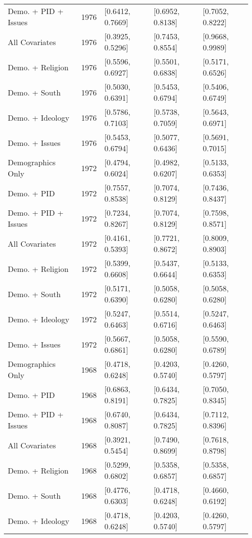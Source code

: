 \begin{longtable}{lrlll}
  Demo. + PID + Issues & 1976 & [0.6412, 0.7669] & [0.6952, 0.8138] & [0.7052, 0.8222] \\ 
  All Covariates & 1976 & [0.3925, 0.5296] & [0.7453, 0.8554] & [0.9668, 0.9989] \\ 
  Demo. + Religion & 1976 & [0.5596, 0.6927] & [0.5501, 0.6838] & [0.5171, 0.6526] \\ 
  Demo. + South & 1976 & [0.5030, 0.6391] & [0.5453, 0.6794] & [0.5406, 0.6749] \\ 
  Demo. + Ideology & 1976 & [0.5786, 0.7103] & [0.5738, 0.7059] & [0.5643, 0.6971] \\ 
  Demo. + Issues & 1976 & [0.5453, 0.6794] & [0.5077, 0.6436] & [0.5691, 0.7015] \\ 
  Demographics Only & 1972 & [0.4794, 0.6024] & [0.4982, 0.6207] & [0.5133, 0.6353] \\ 
  Demo. + PID & 1972 & [0.7557, 0.8538] & [0.7074, 0.8129] & [0.7436, 0.8437] \\ 
  Demo. + PID + Issues & 1972 & [0.7234, 0.8267] & [0.7074, 0.8129] & [0.7598, 0.8571] \\ 
  All Covariates & 1972 & [0.4161, 0.5393] & [0.7721, 0.8672] & [0.8009, 0.8903] \\ 
  Demo. + Religion & 1972 & [0.5399, 0.6608] & [0.5437, 0.6644] & [0.5133, 0.6353] \\ 
  Demo. + South & 1972 & [0.5171, 0.6390] & [0.5058, 0.6280] & [0.5058, 0.6280] \\ 
  Demo. + Ideology & 1972 & [0.5247, 0.6463] & [0.5514, 0.6716] & [0.5247, 0.6463] \\ 
  Demo. + Issues & 1972 & [0.5667, 0.6861] & [0.5058, 0.6280] & [0.5590, 0.6789] \\ 
  Demographics Only & 1968 & [0.4718, 0.6248] & [0.4203, 0.5740] & [0.4260, 0.5797] \\ 
  Demo. + PID & 1968 & [0.6863, 0.8191] & [0.6434, 0.7825] & [0.7050, 0.8345] \\ 
  Demo. + PID + Issues & 1968 & [0.6740, 0.8087] & [0.6434, 0.7825] & [0.7112, 0.8396] \\ 
  All Covariates & 1968 & [0.3921, 0.5454] & [0.7490, 0.8699] & [0.7618, 0.8798] \\ 
  Demo. + Religion & 1968 & [0.5299, 0.6802] & [0.5358, 0.6857] & [0.5358, 0.6857] \\ 
  Demo. + South & 1968 & [0.4776, 0.6303] & [0.4718, 0.6248] & [0.4660, 0.6192] \\ 
  Demo. + Ideology & 1968 & [0.4718, 0.6248] & [0.4203, 0.5740] & [0.4260, 0.5797] \\ 

\end{longtable}
